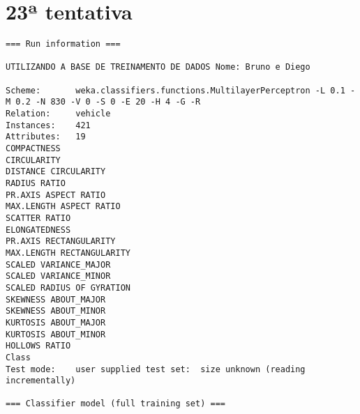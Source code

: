 \documentclass[
	article,			%
	11pt,				%
	oneside,			%
	a4paper,			%
	english,			%
	brazil,				%
	sumario=tradicional
	]{abntex2}
\begin{document}
\section{23ª tentativa}

\begin{lstlisting}
=== Run information ===

UTILIZANDO A BASE DE TREINAMENTO DE DADOS Nome: Bruno e Diego

Scheme:       weka.classifiers.functions.MultilayerPerceptron -L 0.1 -M 0.2 -N 830 -V 0 -S 0 -E 20 -H 4 -G -R
Relation:     vehicle
Instances:    421
Attributes:   19
COMPACTNESS
CIRCULARITY
DISTANCE CIRCULARITY
RADIUS RATIO
PR.AXIS ASPECT RATIO
MAX.LENGTH ASPECT RATIO
SCATTER RATIO
ELONGATEDNESS
PR.AXIS RECTANGULARITY
MAX.LENGTH RECTANGULARITY
SCALED VARIANCE_MAJOR
SCALED VARIANCE_MINOR
SCALED RADIUS OF GYRATION
SKEWNESS ABOUT_MAJOR
SKEWNESS ABOUT_MINOR
KURTOSIS ABOUT_MAJOR
KURTOSIS ABOUT_MINOR
HOLLOWS RATIO
Class
Test mode:    user supplied test set:  size unknown (reading incrementally)

=== Classifier model (full training set) ===


\end{lstlisting}
\end{document}
